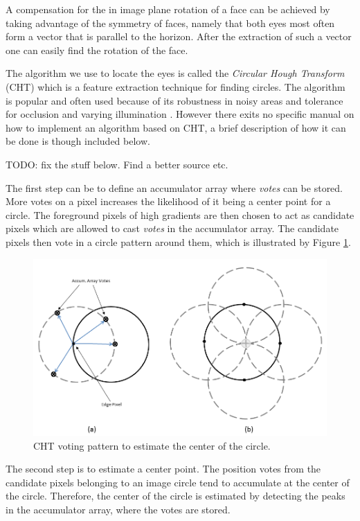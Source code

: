 A compensation for the in image plane rotation of a face can be achieved by taking advantage of the symmetry of faces, namely that both eyes most often form a vector that is parallel to the horizon. After the extraction of such a vector one can easily find the rotation of the face.

The algorithm we use to locate the eyes is called the \textit{Circular Hough Transform} (CHT) which is a feature extraction technique for finding circles. The algorithm is popular and often used because of its robustness in noisy areas and tolerance for occlusion and varying illumination \cite{cht}. However there exits no specific manual on how to implement an algorithm based on CHT, a brief description of how it can be done is though included below.

TODO: fix the stuff below. Find a better source etc.



The first step can be to define an accumulator array where \textit{votes} can be stored. More votes on a pixel increases the likelihood of it being a center point for a circle. The foreground pixels of high gradients are then chosen to act as candidate pixels which are allowed to cast \textit{votes} in the accumulator array. The candidate pixels then vote in a circle pattern around them, which is illustrated by Figure \ref{fig:CHT}.

\begin{figure}[H]
\includegraphics[scale=0.4]{img/fd/accarray.png}
\caption{CHT voting pattern to estimate the center of the circle.}
\label{fig:CHT}
\end{figure}

The second step is to estimate a center point. The position votes from the candidate pixels belonging to an image circle tend to accumulate at the center of the circle. Therefore, the center of the circle is estimated by detecting the peaks in the accumulator array, where the votes are stored.


